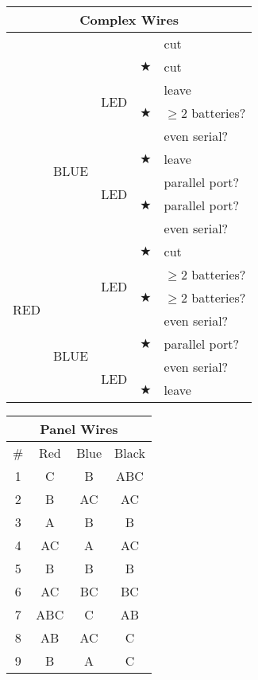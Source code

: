 \documentclass[11pt]{article}
\begin{document}
\begin{multicols}{2}
\begin{tabular}{|c|c|c|c|l|}
\hline
\multicolumn{5}{|c|}{Complex Wires} \\
\hline
\multirow{8}{*}{} & \multirow{4}{*}{} & \multirow{2}{*}{} & & cut \\
\cline{4-5}
 & & & $\bigstar$ & cut \\
\cline{3-5}
 & & \multirow{2}{*}{LED} & & leave \\
\cline{4-5}
 & & & $\bigstar$ & $\ge 2$ batteries? \\
\cline{2-5}
 & \multirow{4}{*}{BLUE} & & & even serial? \\
\cline{4-5}
 & & & $\bigstar$ & leave \\
\cline{3-5}
 & & \multirow{2}{*}{LED} & & parallel port? \\
\cline{4-5}
 & & & $\bigstar$ & parallel port? \\
\hline
\multirow{8}{*}{RED} & \multirow{4}{*}{} & \multirow{2}{*}{} & & even serial?\\
\cline{4-5}
 & & & $\bigstar$ & cut \\
\cline{3-5}
 & & \multirow{2}{*}{LED} & & $\ge 2$ batteries? \\
\cline{4-5}
 & & & $\bigstar$ & $\ge 2$ batteries? \\
\cline{2-5}
 & \multirow{4}{*}{BLUE} & & & even serial? \\
\cline{4-5}
 & & & $\bigstar$ & parallel port? \\
\cline{3-5}
 & & \multirow{2}{*}{LED} & & even serial? \\
\cline{4-5}
 & & & $\bigstar$ & leave \\
\hline
\end{tabular}

\begin{tabular}{|c|c|c|c|}
\hline
\multicolumn{4}{|c|}{Panel Wires} \\
\hline
\# & Red & Blue & Black \\
\hline
1  & C   & B   & ABC \\
2  & B   & AC  & AC  \\
3  & A   & B   & B   \\
4  & AC  & A   & AC  \\
5  & B   & B   & B   \\
6  & AC  & BC  & BC  \\
7  & ABC & C   & AB  \\
8  & AB  & AC  & C   \\
9  & B   & A   & C   \\
\hline
\end{tabular}

\end{multicols}
\end{document}
